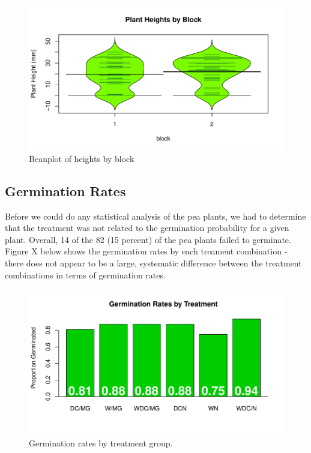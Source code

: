 \documentclass[1p,12pt]{elsarticle}\usepackage[]{graphicx}\usepackage[]{color}
\makeatletter
\def\maxwidth{ %
  \ifdim\Gin@nat@width>\linewidth
    \linewidth
  \else
    \Gin@nat@width
  \fi
}
\newenvironment{knitrout}{}{} %
\makeatother
\begin{document}
\begin{knitrout}
\color{fgcolor}\begin{figure}
\includegraphics[width=\maxwidth]{figure/block_bean-1} \caption[Beanplot of heights by block]{Beanplot of heights by block}\label{fig:block_bean}
\end{figure}


\end{knitrout}


\subsection{Germination Rates}
Before we could do any statistical analysis of the pea plants, we had to determine that the treatment was not related to the germination probability for a given plant. Overall, 14 of the 82 (15 percent) of the pea plants failed to germinate. Figure X below shows the germination rates by each treament combination - there does not appear to be a large, systematic difference between the treatment combinations in terms of germination rates. 

\begin{knitrout}
\color{fgcolor}\begin{figure}
\includegraphics[width=\maxwidth]{figure/germination_rates-1} \caption[Germination rates by treatment group]{Germination rates by treatment group.}\label{fig:germination_rates}
\end{figure}


\end{knitrout}
\end{document}
